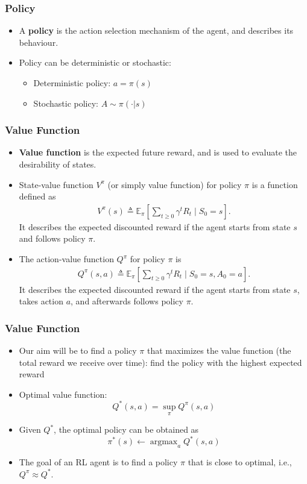 \documentclass{beamer}
\newcommand{\eqdef}{\triangleq}
\newcommand{\EEX}[2]{{\mathbb E}_{#1}\left[#2\right]}
\newcommand{\Qopt}{Q^*}
\newcommand{\Vpi}{V^\pi}
\newcommand{\Qpi}{Q^\pi}
\newcommand{\piopt}{{\pi^*}}
\newcommand{\argmax}{\mathop{\text{argmax}}}
\renewcommand{\high}{\textbf}
\begin{document}
\begin{frame}\frametitle{Policy}\small
\begin{itemize}
\item A \high{policy} is the action selection mechanism of the agent, and describes its behaviour.
\item Policy can be deterministic or stochastic:
	\begin{itemize}
		\item Deterministic policy: $a = \pi(s)$
		\item Stochastic policy: $A \sim \pi(\cdot|s)$
	\end{itemize}
\end{itemize}
\end{frame}


\begin{frame}\frametitle{Value Function}\small
\begin{itemize}
\item \high{Value function} is the expected future reward, and is used to evaluate the desirability of states.
\item State-value function $\Vpi$ (or simply value function) for policy $\pi$ is a function defined as
\begin{align*}
	\Vpi(s) \eqdef \EEX{\pi}{\sum_{t \geq 0} \gamma^t R_t \mid S_0 = s}.
\end{align*}
It describes the expected discounted reward if the agent starts from state $s$ and follows policy $\pi$.

\item The action-value function $\Qpi$ for policy $\pi$ is
\begin{align*}
	\Qpi(s,a) \eqdef \EEX{\pi}{\sum_{t \geq 0} \gamma^t R_t \mid S_0 = s, A_0 = a}.
\end{align*}
It describes the expected discounted reward if the agent starts from state $s$, takes action $a$, and afterwards follows policy $\pi$.
\end{itemize}
\end{frame}

\begin{frame}\frametitle{Value Function}\small

\begin{itemize}
	\item Our aim will be to find a policy $\pi$ that maximizes the value function (the total reward we receive over time): find the policy with the highest expected reward
	\item Optimal value function:
	\[
	  \Qopt(s,a) = \sup_\pi \Qpi(s,a)
	\]

	\item Given $\Qopt$, the optimal policy can be obtained as
	\[
	  \piopt(s) \leftarrow \argmax_a \Qopt(s,a)
	\]

	\item The goal of an RL agent is to find a policy $\pi$ that is close to optimal, i.e., $\Qpi \approx \Qopt$.
\end{itemize}
\end{frame}
\end{document}
